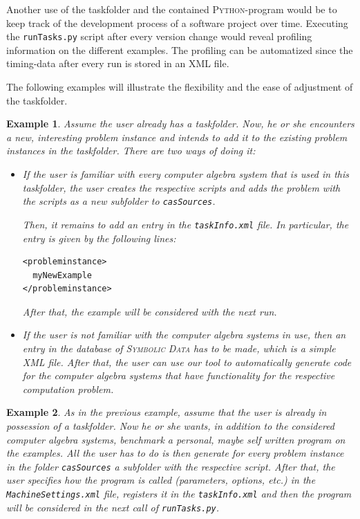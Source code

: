 \documentclass[12pt]{article}
\newtheorem{example}{Example}
\begin{document}
Another use of the taskfolder and the contained \textsc{Python}-program would
be to keep track of the development process of a software project over
time. Executing the \texttt{runTasks.py} script after every version change
would reveal profiling information on the different examples. The profiling can
be automatized since the timing-data after every run is stored in an
\textsc{XML} file.

The following examples will illustrate the flexibility and the ease of
adjustment of the taskfolder.

\begin{example}
  Assume the user already has a taskfolder. Now, he or she encounters a new,
  interesting problem instance and intends to add it to the existing problem
  instances in the taskfolder. There are two ways of doing it:
  \begin{itemize}
  \item If the user is familiar with every computer algebra system that is used
    in this taskfolder, the user creates the respective scripts and adds the
    problem with the scripts as a new subfolder to \texttt{casSources}.


    Then, it remains to add an entry in the \texttt{taskInfo.xml} file. In
    particular, the entry is given by the following lines:
\begin{verbatim}
<probleminstance>
  myNewExample
</probleminstance>
\end{verbatim}
  After that, the example will be considered with the next run.
  \item If the user is not familiar with the computer algebra systems in use,
    then an entry in the database of \textsc{Symbolic Data} has to be made,
    which is a simple \textsc{XML} file. After that, the user can use our tool
    to automatically generate code for the computer algebra systems that have
    functionality for the respective computation problem.
  \end{itemize}
\end{example}

\begin{example}
  As in the previous example, assume that the user is already in possession of
  a taskfolder. Now he or she wants, in addition to the considered computer
  algebra systems, benchmark a personal, maybe self written program on the
  examples. All the user has to do is then generate for every problem instance
  in the folder \texttt{casSources} a subfolder with the respective
  script. After that, the user specifies how the program is called (parameters,
  options, etc.) in the \texttt{MachineSettings.xml} file, registers it in the
  \texttt{taskInfo.xml} and then the program will be considered in the next
  call of \texttt{runTasks.py}.
\end{example}
\end{document}
